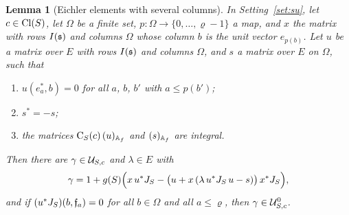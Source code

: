 \documentclass[11pt,a4paper]{article}
\theoremstyle{plainx}
\newtheorem{lemma}[theorem]{Lemma}
\theoremstyle{uprightx}
\begin{document}
\begin{lemma}[Eichler elements with several columns]\label{l:eichler}
In Setting~\ref{set:su}, let $c\in\mathrm{Cl}(S)$, let $\Omega$ be a finite set, $p\colon\Omega\to\{0,\dots,\varrho-1\}$ a
map, and $x$ the matrix with rows $I(\mathfrak{s})$ and columns $\Omega$ whose column $b$ is the unit vector $e_{p(b)}$.
Let $u$ be a matrix over $E$ with rows $I(\mathfrak{s})$ and columns $\Omega$, and $s$ a matrix over $E$ on $\Omega$, such
that
\begin{enumerate}[label=(\roman*),itemsep=1pt]
\item $u(e^*_a,b)=0$ for all $a$, $b$, $b'$ with $a\le p(b')$;
\item $s^{*}=-s$;
\item the matrices $\mathrm{C}_{S}(c)\,(u)_{\mathbb{A}_{f}}$ and $(s)_{\mathbb{A}_{f}}$ are integral.
\end{enumerate}
Then there are $\gamma\in\mathcal{U}_{S,c}$ and $\lambda\in E$ with
\[\gamma=1+g(S)\Bigl(x\,u^{*}J_{S}-\bigl(u+x\,(\lambda\,u^{*}J_{S}\,u-s)\bigr)\,x^{*}J_{S}\Bigr),\]
and if $(u^{*}J_{S})(b,\mathfrak{f}_{a})=0$ for all $b\in\Omega$ and all $a\le\varrho$, then $\gamma\in\mathcal{U}^{0}_{S,c}$.
\end{lemma}
\end{document}

